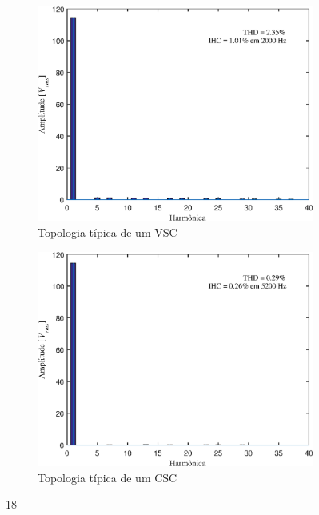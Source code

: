 \begin{figure}[!htb] %
	\centering
	\begin{subfigure}[b]{0.48\textwidth}
		\centering
		\includegraphics[width=\textwidth]{Cap4/Figuras/resultados_unfilt_18.eps}
		\caption{Topologia típica de um VSC} 
		\label{fig:resultados_unfilt_18.eps}
	\end{subfigure}%
		\hfill
	\begin{subfigure}[b]{0.48\textwidth}  
		\centering 
		\includegraphics[width=\textwidth]{Cap4/Figuras/resultados_filt_18.eps}
		\caption{Topologia típica de um CSC}    
		\label{fig:resultados_filt_18.eps}
	\end{subfigure}%
	\caption{18}
	\label{fig:18}
\end{figure}

